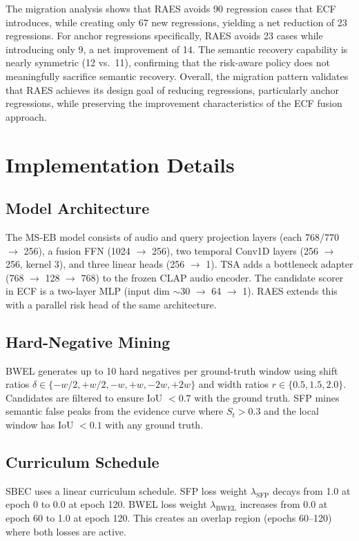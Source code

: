 \documentclass[conference]{IEEEtran}
\begin{document}
The migration analysis shows that RAES avoids 90 regression cases that ECF
introduces, while creating only 67 new regressions, yielding a net reduction of
23 regressions.  For anchor regressions specifically, RAES avoids 23 cases
while introducing only 9, a net improvement of 14.  The semantic recovery
capability is nearly symmetric (12 vs.\ 11), confirming that the risk-aware
policy does not meaningfully sacrifice semantic recovery.  Overall, the
migration pattern validates that RAES achieves its design goal of reducing
regressions, particularly anchor regressions, while preserving the
improvement characteristics of the ECF fusion approach.

\section{Implementation Details}
\label{sec:implementation}

\subsection{Model Architecture}
The MS-EB model consists of audio and query projection layers (each
768/770 \(\rightarrow\) 256), a fusion FFN (1024 \(\rightarrow\) 256), two
temporal Conv1D layers (256 \(\rightarrow\) 256, kernel 3), and three linear
heads (256 \(\rightarrow\) 1).  TSA adds a bottleneck adapter (768 \(\rightarrow\)
128 \(\rightarrow\) 768) to the frozen CLAP audio encoder.  The candidate scorer
in ECF is a two-layer MLP (input dim \(\sim\)30 \(\rightarrow\) 64 \(\rightarrow\)
1).  RAES extends this with a parallel risk head of the same architecture.

\subsection{Hard-Negative Mining}
BWEL generates up to 10 hard negatives per ground-truth window using shift
ratios \(\delta \in \{-w/2, +w/2, -w, +w, -2w, +2w\}\) and width ratios \(r \in
\{0.5, 1.5, 2.0\}\).  Candidates are filtered to ensure IoU \(< 0.7\) with the
ground truth.  SFP mines semantic false peaks from the evidence curve where
\(S_t > 0.3\) and the local window has IoU \(< 0.1\) with any ground truth.

\subsection{Curriculum Schedule}
SBEC uses a linear curriculum schedule.  SFP loss weight \(\lambda_{\text{SFP}}\)
decays from 1.0 at epoch 0 to 0.0 at epoch 120.  BWEL loss weight
\(\lambda_{\text{BWEL}}\) increases from 0.0 at epoch 60 to 1.0 at epoch 120.
This creates an overlap region (epochs 60--120) where both losses are active.
\end{document}
